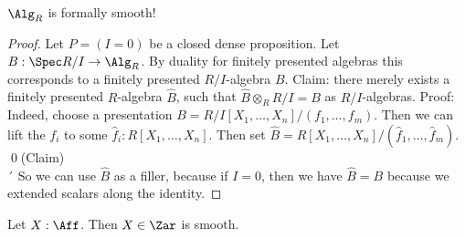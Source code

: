 \begin{lemma}{\label{lemma:AffSmooth}}
	$\Alg_R$ is formally smooth!
\end{lemma}
\begin{proof}
	Let $P = (I = 0)$ be a closed dense proposition. Let $B : \Spec R / I \to \Alg_R$. By duality for finitely presented algebras this corresponds to a finitely presented $R / I$-algebra $B$. Claim: there merely exists a finitely presented $R$-algebra $\hat B$, such that $\hat B \otimes_R R / I= B$ as $R / I$-algebras.
	Proof: Indeed, choose a presentation $B = R/I [X_1,\hdots,X_n] /( f_1,\hdots,f_m)$. Then we can lift the $f_i$ to some $\hat f_i : R[X_1,\hdots,X_n].$ Then set $\hat B = R[X_1,\hdots,X_n] / (\hat f_1,\hdots,\hat f_m)$. \qed(Claim) \\´
	So we can use $\hat B$ as a filler, because if $I = 0$, then we have $\hat B = B$ because we extended scalars along the identity.
\end{proof}


\begin{lemma}
	Let $X : \Aff$. Then $X \in \Zar$ is smooth.
\end{lemma}%
%

